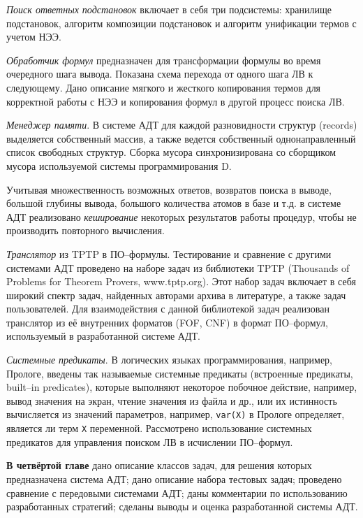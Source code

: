 \documentclass[a4paper]{report}
\begin{document}
\emph{Поиск ответных подстановок} включает в себя три подсистемы: хранилище подстановок, алгоритм композиции подстановок и алгоритм унификации термов с учетом НЭЭ.

\emph{Обработчик формул} предназначен для трансформации формулы во время очередного шага вывода. Показана схема перехода от одного шага ЛВ к следующему. Дано описание мягкого и жесткого копирования термов для корректной работы с НЭЭ и копирования формул в другой процесс поиска ЛВ.

\emph{Менеджер памяти}. В системе АДТ для каждой разновидности структур (records) выделяется собственный массив, а также ведется собственный однонаправленный список свободных структур. Сборка мусора синхронизирована со сборщиком мусора используемой системы программирования D.

Учитывая множественность возможных ответов, возвратов поиска в выводе, большой глубины вывода, большого количества атомов в базе и т.д. в системе АДТ реализовано \emph{кеширование} некоторых результатов работы процедур, чтобы не производить повторного вычисления.

\emph{Транслятор} из TPTP в ПО--формулы. Тестирование и сравнение с другими системами АДТ проведено на наборе задач из библиотеки TPTP (Thousands of Problems for Theorem Provers, www.tptp.org). Этот набор задач включает в себя широкий спектр задач, найденных авторами архива в литературе, а также задач пользователей. Для взаимодействия с данной библиотекой задач реализован транслятор из её внутренних форматов (FOF, CNF) в формат ПО--формул, используемый в разработанной системе АДТ.

\emph{Системные предикаты}. В логических языках программирования, например, Прологе, введены так называемые системные предикаты (встроенные предикаты, built--in predicates), которые выполняют некоторое побочное действие, например, вывод значения на экран, чтение значения из файла и др., или их истинность вычисляется из значений параметров, например, \texttt{var(X)} в Прологе определяет, является ли терм \texttt{X} переменной. Рассмотрено использование системных предикатов для управления поиском ЛВ в исчислении ПО--формул.


\textbf{В четвёртой главе} дано описание классов задач, для решения которых предназначена система АДТ; дано описание набора тестовых задач; проведено сравнение с передовыми системами АДТ; даны комментарии по использованию разработанных стратегий; сделаны выводы и оценка разработанной системы АДТ.
\end{document}
